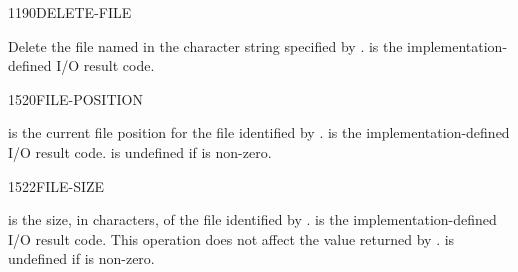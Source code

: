 \begin{worddef}{1190}{DELETE-FILE}
\item {}

	Delete the file named in the character string specified by
	.  is the implementation-defined
	I/O result code.
\end{worddef}


\begin{worddef}{1520}{FILE-POSITION}
\item {}

	 is the current file position for the file identified
	by .  is the implementation-defined I/O
	result code.  is undefined if  is non-zero.
\end{worddef}


\begin{worddef}{1522}{FILE-SIZE}
\item {}

	 is the size, in characters, of the file identified by
	.  is the implementation-defined I/O
	result code. This operation does not affect the value returned
	by .  is undefined if 
	is non-zero.
\end{worddef}


